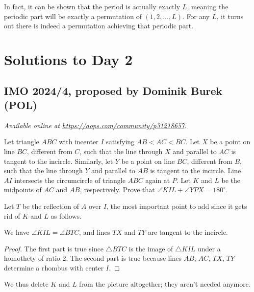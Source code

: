 \documentclass[11pt]{scrartcl}
\begin{document}
\begin{remark*}
  In fact, it can be shown that the period is actually exactly $L$,
  meaning the periodic part will be exactly a permutation of $(1,2,\dots,L)$.
  For any $L$, it turns out there is indeed a permutation achieving that periodic part.
\end{remark*}
\pagebreak

\section{Solutions to Day 2}
\subsection{IMO 2024/4, proposed by Dominik Burek (POL)}
\textsl{Available online at \url{https://aops.com/community/p31218657}.}
\begin{mdframed}[style=mdpurplebox,frametitle={Problem statement}]
Let triangle $ABC$ with incenter $I$ satisfying $AB < AC < BC$.
Let $X$ be a point on line $BC$, different from $C$,
such that the line through $X$ and parallel to $AC$ is tangent to the incircle.
Similarly, let $Y$ be a point on line $BC$, different from $B$,
such that the line through $Y$ and parallel to $AB$ is tangent to the incircle.
Line $AI$ intersects the circumcircle of triangle $ABC$ again at $P$.
Let $K$ and $L$ be the midpoints of $AC$ and $AB$, respectively.
Prove that $\angle KIL + \angle YPX = 180^{\circ}$.
\end{mdframed}
Let $T$ be the reflection of $A$ over $I$, the most important point to add
since it gets rid of $K$ and $L$ as follows.
\begin{claim*}
  We have $\angle KIL = \angle BTC$,
  and lines $TX$ and $TY$ are tangent to the incircle.
\end{claim*}
\begin{proof}
  The first part is true since $\triangle BTC$ is the image of $\triangle KIL$
  under a homothety of ratio $2$.
  The second part is true because lines $AB$, $AC$, $TX$, $TY$
  determine a rhombus with center $I$.
\end{proof}

We thus delete $K$ and $L$ from the picture altogether; they aren't needed anymore.
\end{document}
